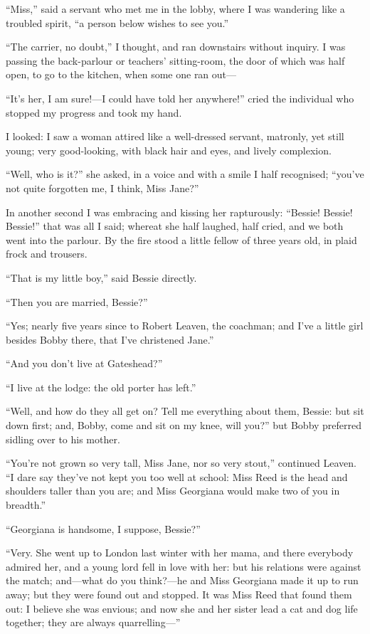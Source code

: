 \enquote{Miss,} said a servant who met me in the lobby, where I was
wandering like a troubled spirit, \enquote{a person below wishes to see
	you.}

\enquote{The carrier, no doubt,} I thought, and ran downstairs without
inquiry. I was passing the back-parlour or teachers' sitting-room, the
door of which was half open, to go to the kitchen, when some one ran
out---

\enquote{It's her, I am sure!---I could have told her anywhere!} cried
the individual who stopped my progress and took my hand.

I looked: I saw a woman attired like a well-dressed servant, matronly,
yet still young; very good-looking, with black hair and eyes, and lively
complexion.

\enquote{Well, who is it?} she asked, in a voice and with a smile I half
recognised; \enquote{you've not quite forgotten me, I think, Miss Jane?}

In another second I was embracing and kissing her rapturously:
\enquote{Bessie! Bessie! Bessie!} that was all I said; whereat she
half laughed, half cried, and we both went into the parlour. By the
fire stood a little fellow of three years old, in plaid frock and
trousers.

\enquote{That is my little boy,} said Bessie directly.

\enquote{Then you are married, Bessie?}

\enquote{Yes; nearly five years since to Robert Leaven, the coachman;
	and I've a little girl besides Bobby there, that I've christened Jane.}

\enquote{And you don't live at Gateshead?}

\enquote{I live at the lodge: the old porter has left.}

\enquote{Well, and how do they all get on? Tell me everything about
	them, Bessie: but sit down first; and, Bobby, come and sit on my knee,
	will you?} but Bobby preferred sidling over to his mother.

\enquote{You're not grown so very tall, Miss Jane, nor so very stout,}
continued \Mrs{} Leaven. \enquote{I dare say they've not kept you too
	well at school: Miss Reed is the head and shoulders taller than you are;
	and Miss Georgiana would make two of you in breadth.}

\enquote{Georgiana is handsome, I suppose, Bessie?}

\enquote{Very. She went up to London last winter with her mama, and
	there everybody admired her, and a young lord fell in love with her: but
	his relations were against the match; and---what do you think?---he and
	Miss Georgiana made it up to run away; but they were found out and
	stopped. It was Miss Reed that found them out: I believe she was
	envious; and now she and her sister lead a cat and dog life together;
	they are always quarrelling---}

